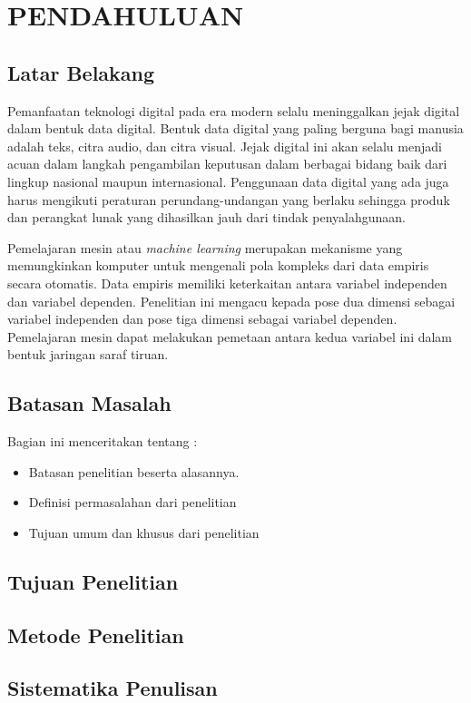 
\chapter{PENDAHULUAN}
\label{cha:1-Pendahuluan}

\section{Latar Belakang}
\label{sec:1-LatarBelakang}

Pemanfaatan teknologi digital pada era modern selalu meninggalkan jejak digital dalam bentuk data 
digital. Bentuk data digital yang paling berguna bagi manusia adalah teks, citra audio, dan citra 
visual. Jejak digital ini akan selalu menjadi acuan dalam langkah pengambilan keputusan dalam 
berbagai bidang baik dari lingkup nasional maupun internasional. Penggunaan data digital yang ada 
juga harus mengikuti peraturan perundang-undangan yang berlaku sehingga produk dan perangkat lunak 
yang dihasilkan jauh dari tindak penyalahgunaan.

Pemelajaran mesin atau \textit{machine learning} merupakan mekanisme yang memungkinkan komputer 
untuk mengenali pola kompleks dari data empiris secara otomatis. Data empiris memiliki keterkaitan 
antara variabel independen dan variabel dependen. Penelitian ini mengacu kepada pose dua dimensi 
sebagai variabel independen dan pose tiga dimensi sebagai variabel dependen. Pemelajaran mesin 
dapat melakukan pemetaan antara kedua variabel ini dalam bentuk jaringan saraf tiruan.



\section{Batasan Masalah}
\label{sec:1-BatasMasalah}

Bagian ini menceritakan tentang :
\begin{itemize}
\item Batasan penelitian beserta alasannya.
\item Definisi permasalahan dari penelitian
\item Tujuan umum dan khusus dari penelitian
\end{itemize}

\section{Tujuan Penelitian}
\label{sec:1-TujuanPenelitian}

\section{Metode Penelitian}
\label{sec:1-MetodePenelitian}

\section{Sistematika Penulisan}
\label{sec:1-SistematikaPenulisan}
